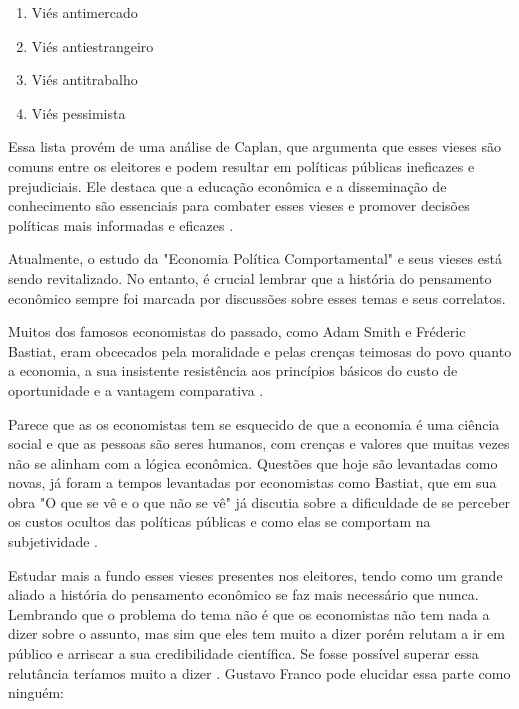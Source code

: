 \begin{enumerate}
    \item Viés antimercado
    \item Viés antiestrangeiro
    \item Viés antitrabalho
    \item Viés pessimista
\end{enumerate}

Essa lista provém de uma análise de Caplan, que argumenta que esses vieses são comuns entre os eleitores e podem resultar em políticas públicas ineficazes e prejudiciais. Ele destaca que a educação econômica e a disseminação de conhecimento são essenciais para combater esses vieses e promover decisões políticas mais informadas e eficazes \cite{The_Myth_of_the_Rational_Voter}.

Atualmente, o estudo da "Economia Política Comportamental" e seus vieses está sendo revitalizado. No entanto, é crucial lembrar que a história do pensamento econômico sempre foi marcada por discussões sobre esses temas e seus correlatos.

Muitos dos famosos economistas do passado, como Adam Smith e Fréderic Bastiat, eram obcecados pela moralidade e pelas crenças teimosas do povo quanto a economia, a sua insistente resistência  aos princípios básicos do custo de oportunidade e a vantagem comparativa \cite{hart2019bastiat,Wells2013,The_Myth_of_the_Rational_Voter}.

Parece que as os economistas tem se esquecido de que a economia é uma ciência social e que as pessoas são seres humanos, com crenças e valores que muitas vezes não se alinham com a lógica econômica. Questões que hoje são levantadas como novas, já foram a tempos levantadas por economistas como Bastiat, que em sua obra "O que se vê e o que não se vê" já discutia sobre a dificuldade de se perceber os custos ocultos das políticas públicas e como elas se comportam na subjetividade \cite{hart2019bastiat}.

Estudar mais a fundo esses vieses presentes nos eleitores, tendo como um grande aliado a história do pensamento econômico se faz mais necessário que nunca. Lembrando que o problema do tema não é que os economistas não tem nada a dizer sobre o assunto, mas sim que eles tem muito a dizer porém relutam a ir em público e arriscar a sua credibilidade científica. Se fosse possível superar essa relutância teríamos muito a dizer \cite{The_Myth_of_the_Rational_Voter}. Gustavo Franco pode elucidar essa parte como ninguém:

